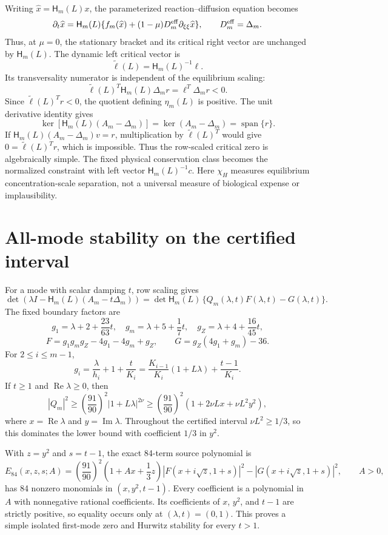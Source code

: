 Writing $\widehat x=\mathsf H_m(L)x$, the parameterized reaction--diffusion
equation becomes
\[
 \partial_t\widehat x=\mathsf H_m(L)
 \{f_m(\widehat x)+(1-\mu)D_m^{\rm eff}
 \partial_{\xi\xi}\widehat x\},
 \qquad D_m^{\rm eff}=\Delta_m.
\]
Thus, at $\mu=0$, the stationary bracket and its critical right vector are
unchanged by $\mathsf H_m(L)$.  The dynamic left critical vector is
\[
 \widetilde\ell(L)=\mathsf H_m(L)^{-1}\ell.
\]
Its transversality numerator is independent of the equilibrium scaling:
\[
 \widetilde\ell(L)^T\mathsf H_m(L)\Delta_m r
 =\ell^T\Delta_m r<0.
\]
Since $\widetilde\ell(L)^Tr<0$, the quotient defining
$\eta_m(L)$ is positive.
The unit derivative identity gives
\[
 \ker[\mathsf H_m(L)(A_m-\Delta_m)]
 =\ker(A_m-\Delta_m)=\operatorname{span}\{r\}.
\]
If $\mathsf H_m(L)(A_m-\Delta_m)v=r$, multiplication by
$\widetilde\ell(L)^T$ would give
$0=\widetilde\ell(L)^Tr$, which is impossible.  Thus the row-scaled
critical zero is algebraically simple.
The fixed physical conservation class becomes the normalized constraint with
left vector $\mathsf H_m(L)^{-1}c$.
Here $\chi_H$ measures equilibrium concentration-scale separation, not a
universal measure of biological expense or implausibility.


\section*{All-mode stability on the certified interval}
For a mode with scalar damping $t$, row scaling gives
\[
 \det(\lambda I-\mathsf H_m(L)(A_m-t\Delta_m))
 =\det \mathsf H_m(L)\,\{Q_m(\lambda,t)F(\lambda,t)-G(\lambda,t)\}.
\]
The fixed boundary factors are
\[
 g_1=\lambda+2+\frac{23}{63}t,
 \quad g_m=\lambda+5+\frac17t,
 \quad g_Z=\lambda+4+\frac{16}{45}t,
\]
\[
 F=g_1g_mg_Z-4g_1-4g_m+g_Z,
 \qquad G=g_Z(4g_1+g_m)-36.
\]
For $2\le i\le m-1$,
\[
 g_i=\frac{\lambda}{h_i}+1+\frac{t}{K_i}
 =\frac{K_{i-1}}{K_i}(1+L\lambda)+\frac{t-1}{K_i}.
\]
If $t\ge1$ and $\operatorname{Re}\lambda\ge0$, then
\[
 |Q_m|^2\ge\left(\frac{91}{90}\right)^2|1+L\lambda|^{2\nu}
 \ge\left(\frac{91}{90}\right)^2
 \left(1+2\nu Lx+\nu L^2y^2\right),
\]
where $x=\operatorname{Re}\lambda$ and $y=\operatorname{Im}\lambda$.
Throughout the certified interval $\nu L^2\ge1/3$, so this dominates the
lower bound with coefficient $1/3$ in $y^2$.

With $z=y^2$ and $s=t-1$, the exact 84-term source polynomial is
\[
 E_{84}(x,z,s;A)=\left(\frac{91}{90}\right)^2
 \left(1+A x+\frac13z\right)
 |F(x+i\sqrt z,1+s)|^2-|G(x+i\sqrt z,1+s)|^2,
 \qquad A>0,
\]
has 84 nonzero monomials in $(x,y^2,t-1)$.  Every coefficient is a
polynomial in $A$ with nonnegative rational coefficients.  Its coefficients
of $x$, $y^2$, and $t-1$ are strictly positive, so equality occurs only at
$(\lambda,t)=(0,1)$.  This proves a simple isolated first-mode zero and
Hurwitz stability for every $t>1$.


